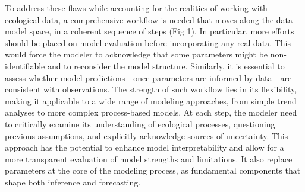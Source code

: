 \documentclass[11pt]{article}
\begin{document}
To address these flaws while accounting for the realities of working with ecological data, a comprehensive workflow is needed that moves along the data-model space, in a coherent sequence of steps (Fig 1). In particular, more efforts should be placed on model evaluation before incorporating any real data. This would force the modeler to acknowledge that some parameters might be non-identifiable and to reconsider the model structure. Similarly, it is essential to assess whether model predictions---once parameters are informed by data---are consistent with observations. The strength of such workflow lies in its flexibility, making it applicable to a wide range of modeling approaches, from simple trend analyses to more complex process-based models. At each step, the modeler need to critically examine its understanding of ecological processes, questioning previous assumptions, and explicitly acknowledge sources of uncertainty. This approach has the potential to enhance model interpretability and allow for a more transparent evaluation of model strengths and limitations. It also replace parameters at the core of the modeling process, as fundamental components that shape both inference and forecasting. 
\end{document}
